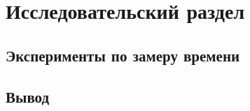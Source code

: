 \chapter{Исследовательский раздел}
\label{cha:research}

\section{Эксперименты по замеру времени}

\pagebreak
\section{Вывод}

